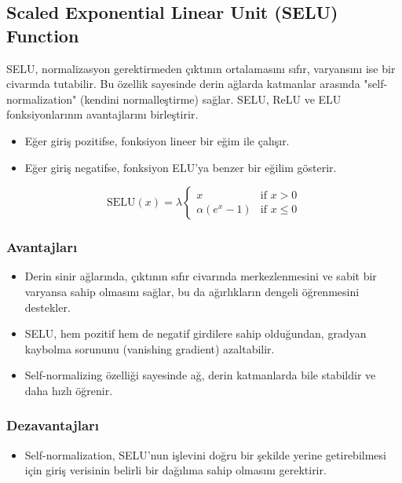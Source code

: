 \newpage

\subsection{Scaled Exponential Linear Unit (SELU) Function}

SELU, normalizasyon gerektirmeden çıktının ortalamasını sıfır, varyansını ise bir civarında tutabilir. Bu özellik sayesinde derin ağlarda katmanlar arasında "self-normalization" (kendini normalleştirme) sağlar. SELU, ReLU ve ELU fonksiyonlarının avantajlarını birleştirir.

\begin{itemize}
    \item Eğer giriş pozitifse, fonksiyon lineer bir eğim ile çalışır.
    \item Eğer giriş negatifse, fonksiyon ELU'ya benzer bir eğilim gösterir.
\end{itemize}

\[\text{SELU}(x) = \lambda \begin{cases} 
x & \text{if } x > 0 \\
\alpha (e^x - 1) & \text{if } x \leq 0
\end{cases}\]

\subsubsection{Avantajları}

\begin{itemize}
    \item Derin sinir ağlarında, çıktının sıfır civarında merkezlenmesini ve sabit bir varyansa sahip olmasını sağlar, bu da ağırlıkların dengeli öğrenmesini destekler.
    \item SELU, hem pozitif hem de negatif girdilere sahip olduğundan, gradyan kaybolma sorununu (vanishing gradient) azaltabilir.
    \item Self-normalizing özelliği sayesinde ağ, derin katmanlarda bile stabildir ve daha hızlı öğrenir.
\end{itemize}

\subsubsection{Dezavantajları}

\begin{itemize}
    \item Self-normalization, SELU'nun işlevini doğru bir şekilde yerine getirebilmesi için giriş verisinin belirli bir dağılıma sahip olmasını gerektirir.
\end{itemize}

